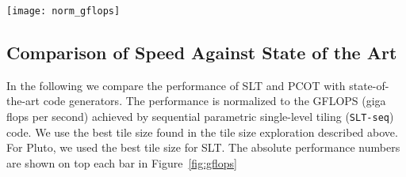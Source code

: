 %
%
%
%
%


\begin{figure*}[tb]
  \centering
    \texttt{[image: norm\_gflops]}
\caption{Performance of SLT and PCOT on (a)
Haswell and (b) Broadwell, normalized to sequential parametric SLT
\texttt{SLT-seq} (higher the better). The absolute performance numbers are
shown on top of each bar in GFLOPS. Both the sequential and the parallel
performance of SLT and PCOT closely matches the performance of other code
generators. \texttt{Other} represents Pluto for the first 4 benchmarks, Pochoir
for Heat-2D and 3D, and Autogen for OSP.}
	\label{fig:gflops}
\end{figure*}




\subsection{Comparison of Speed Against State of the Art}
In the following we compare the performance of SLT and PCOT with
state-of-the-art code generators.  The performance is normalized to the GFLOPS
(giga flops per second) achieved by sequential parametric single-level tiling
(\texttt{SLT-seq}) code.  We use the best tile size found in the tile size
exploration described above. For Pluto, we used the best tile size for SLT.
The absolute performance numbers are shown on top each bar in Figure~\ref{fig:gflops}

